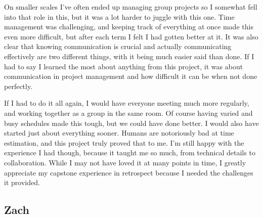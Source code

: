 \documentclass[IEEEtran,letterpaper,10pt,notitlepage,draftclsnofoot,onecolumn]{article}
\begin{document}
On smaller scales I've often ended up managing group projects so I somewhat fell into that role in this, but it was a lot harder to juggle with this one.
Time management was challenging, and keeping track of everything at once made this even more difficult, but after each term I felt I had gotten better at it.
It was also clear that knowing communication is crucial and actually communicating effectively are two different things, with it being much easier said than done.
If I had to say I learned the most about anything from this project, it was about communication in project management and how difficult it can be when not done perfectly.

If I had to do it all again, I would have everyone meeting much more regularly, and working together as a group in the same room.
Of course having varied and busy schedules made this tough, but we could have done better.
I would also have started just about everything sooner. 
Humans are notoriously bad at time estimation, and this project truly proved that to me.
I'm still happy with the experience I had though, because it taught me so much, from technical details to collaboration.
While I may not have loved it at many points in time, I greatly appreciate my capstone experience in retrospect because I needed the challenges it provided.

\subsection{Zach}
\end{document}
